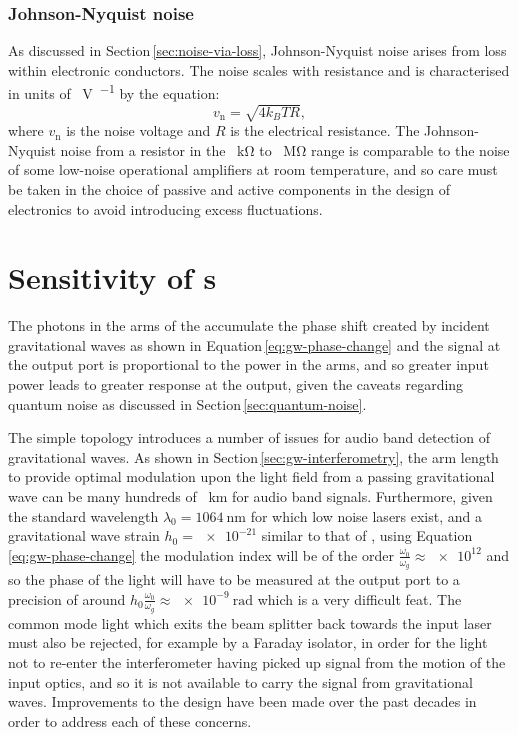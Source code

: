 \subsubsection{\label{sec:johnson-nyquist-noise}Johnson-Nyquist noise}
As discussed in Section\,\ref{sec:noise-via-loss}, Johnson-Nyquist noise arises from loss within electronic conductors. The noise scales with resistance and is characterised in units of \SI{}{\volt\per\sqrthz} by the equation:
\begin{equation}
  v_{\text{n}} = \sqrt{4 k_B T R},
\end{equation}
where $v_{\text{n}}$ is the noise voltage and $R$ is the electrical resistance. The Johnson-Nyquist noise from a resistor in the \SI{}{\kilo\ohm} to \SI{}{\mega\ohm} range is comparable to the noise of some low-noise operational amplifiers at room temperature, and so care must be taken in the choice of passive and active components in the design of electronics to avoid introducing excess fluctuations.

\section{\label{sec:ifo-response}Sensitivity of \MI{}s}
The photons in the arms of the \MI{} accumulate the phase shift created by incident gravitational waves as shown in Equation\,\ref{eq:gw-phase-change} and the signal at the output port is proportional to the power in the arms, and so greater input power leads to greater response at the output, given the caveats regarding quantum noise as discussed in Section\,\ref{sec:quantum-noise}.

The simple \MI{} topology introduces a number of issues for audio band detection of gravitational waves. As shown in Section\,\ref{sec:gw-interferometry}, the arm length to provide optimal modulation upon the light field from a passing gravitational wave can be many hundreds of \SI{}{\kilo\meter} for audio band signals. Furthermore, given the standard wavelength $\lambda_0 = \SI{1064}{\nano\meter}$ for which low noise lasers exist, and a gravitational wave strain $h_0 = \num{e-21}$ similar to that of \GWFIRSTEVENT{}, using Equation\,\ref{eq:gw-phase-change} the modulation index will be of the order $\frac{\omega_0}{\omega_g} \approx \num{e12}$ and so the phase of the light will have to be measured at the output port to a precision of around $h_0 \frac{\omega_0}{\omega_g} \approx \SI{e-9}{\radian}$ which is a very difficult feat. The common mode light which exits the beam splitter back towards the input laser must also be rejected, for example by a Faraday isolator, in order for the light not to re-enter the interferometer having picked up signal from the motion of the input optics, and so it is not available to carry the signal from gravitational waves. Improvements to the \MI{} design have been made over the past decades in order to address each of these concerns.

